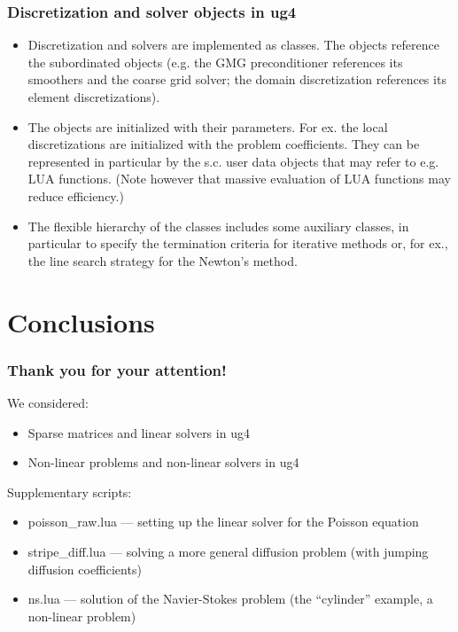 \documentclass[xcolor=dvipsnames]{beamer}
\begin{document}
\begin {frame} [t]
\frametitle {Discretization and solver objects in ug4}
\vspace {-2ex}
\begin {itemize}
	\item Discretization and solvers are implemented as {\color{blue} classes}. The objects reference
		the subordinated objects (e.g. the GMG preconditioner references its smoothers and
		the coarse grid solver; the domain discretization references its element discretizations).
	\pause
	\item The objects are initialized with their parameters. For ex. the local discretizations
		are initialized with the problem coefficients. They can be represented in particular
		by the s.c. {\color{blue} user data} objects that may refer to e.g. LUA functions.
		(Note however that massive evaluation of LUA functions may reduce efficiency.)
	\pause
	\item The flexible hierarchy of the classes includes some auxiliary classes, in particular
		to specify the termination criteria for iterative methods or, for ex., the
		line search strategy for the Newton's method.
\end {itemize}
\end {frame}

\section {Conclusions}

\begin {frame} [t]
\frametitle {Thank you for your attention!}
We considered:
\begin {itemize}
	\item Sparse matrices and linear solvers in ug4
	\item Non-linear problems and non-linear solvers in ug4
\end {itemize}

\vspace{6ex}
Supplementary scripts:
\begin {itemize}
	\item poisson\_raw.lua --- setting up the linear solver for the Poisson equation
	\item stripe\_diff.lua --- solving a more general diffusion problem (with jumping diffusion coefficients)
	\item ns.lua --- solution of the Navier-Stokes problem (the ``cylinder'' example, a non-linear problem)
\end {itemize}
\end {frame}
\end{document}
